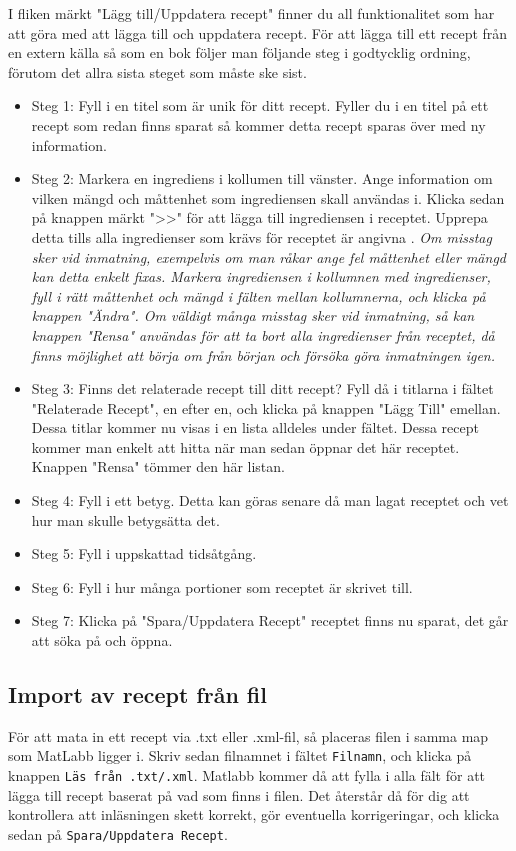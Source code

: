 I fliken märkt "Lägg till/Uppdatera recept" finner du all funktionalitet som har att göra med att lägga till och uppdatera recept. För att lägga till ett recept från en extern källa så som en bok följer man följande steg i godtycklig ordning, förutom det allra sista steget som måste ske sist. 

\begin{itemize}
\item Steg 1: Fyll i en titel som är unik för ditt recept. Fyller du i en titel på ett recept som redan finns sparat så kommer detta recept sparas över med ny information.
\item Steg 2: Markera en ingrediens i kollumen till vänster. Ange information om vilken mängd och måttenhet som ingrediensen skall användas i. Klicka sedan på knappen märkt ">>" för att lägga till ingrediensen i receptet. Upprepa detta tills alla ingredienser som krävs för receptet är angivna .
\em Om misstag sker vid inmatning, exempelvis om man råkar ange fel måttenhet eller mängd kan detta enkelt fixas. Markera ingrediensen i kollumnen med ingredienser, fyll i rätt måttenhet och mängd i fälten mellan kollumnerna, och klicka på knappen "Ändra". 
Om väldigt många misstag sker vid inmatning, så kan knappen "Rensa" användas för att ta bort alla ingredienser från receptet, då finns möjlighet att börja om från början och försöka göra inmatningen igen. \em
\item Steg 3: Finns det relaterade recept till ditt recept? Fyll då i titlarna i fältet "Relaterade Recept", en efter en, och klicka på knappen "Lägg Till" emellan. Dessa titlar kommer nu visas i en lista alldeles under fältet. Dessa recept kommer man enkelt att hitta när man sedan öppnar det här receptet. Knappen "Rensa" tömmer den här listan. 
\item Steg 4: Fyll i ett betyg. Detta kan göras senare då man lagat receptet och vet hur man skulle betygsätta det. 
\item Steg 5: Fyll i uppskattad tidsåtgång.
\item Steg 6: Fyll i hur många portioner som receptet är skrivet till. 
\item Steg 7: Klicka på "Spara/Uppdatera Recept" receptet finns nu sparat, det går att söka på och öppna. 
\end{itemize}

\subsection{Import av recept från fil}
För att mata in ett recept via .txt eller .xml-fil, så placeras filen i samma map som MatLabb ligger i. Skriv sedan filnamnet i fältet \verb+Filnamn+, och klicka på knappen \verb+Läs från .txt/.xml+. Matlabb kommer då att fylla i alla fält för att lägga till recept baserat på vad som finns i filen. Det återstår då för dig att kontrollera att inläsningen skett korrekt, gör eventuella korrigeringar, och klicka sedan på \verb+Spara/Uppdatera Recept+.


